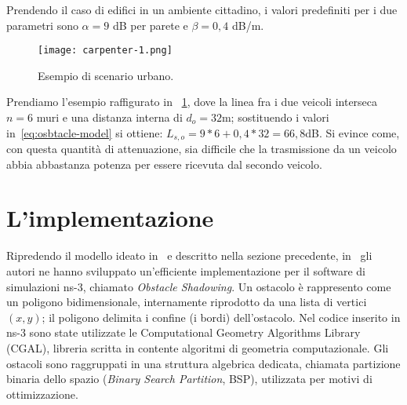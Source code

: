 Prendendo il caso di edifici in un ambiente cittadino, i valori predefiniti per i due parametri sono $\alpha = 9$ dB per parete e $\beta = 0,4$ dB/m.
%
\begin{figure}[htbp]
	\centering
		\texttt{[image: carpenter-1.png]}
\caption{Esempio di scenario urbano.\label{fig:scenario-urbano-1}}
\end{figure}
%
Prendiamo l'esempio raffigurato in \figurename~\ref{fig:scenario-urbano-1}, dove la linea fra i due veicoli interseca $n=6$ muri e una distanza interna di $d_o=32$m;
sostituendo i valori in~\ref{eq:osbtacle-model} si ottiene: $L_{s,o} = 9*6 + 0,4*32 = 66,8$dB.
Si evince come, con questa quantità di attenuazione, sia difficile che la trasmissione da un veicolo abbia abbastanza potenza per essere ricevuta dal secondo veicolo.
%
\section{L'implementazione}\label{sec:implementazione}
Ripredendo il modello ideato in~\cite{5720204} e descritto nella sezione precedente, in~\cite{Carpenter:2015:OMI:2756509.2756512} gli autori ne hanno sviluppato
un'efficiente implementazione per il software di simulazioni ns-3, chiamato \textit{Obstacle Shadowing}.
Un ostacolo è rappresento come un poligono bidimensionale, internamente riprodotto da una lista di vertici $(x,y)$; il poligono delimita
i confine (i bordi) dell'ostacolo.
Nel codice inserito in ns-3 sono state utilizzate le Computational Geometry Algorithms Library (CGAL), libreria scritta in \Cpp contente algoritmi di geometria computazionale.
Gli ostacoli sono raggruppati in una struttura algebrica dedicata, chiamata partizione binaria dello spazio (\textit{Binary Search Partition}, BSP), utilizzata
per motivi di ottimizzazione.

